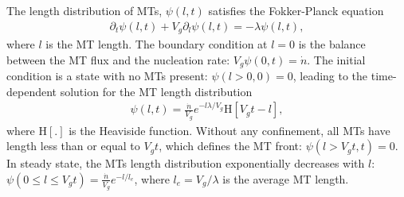 \documentclass[11pt]{article}
\begin{document}
The length distribution of MTs, $\psi(l,t)$ satisfies the Fokker-Planck equation
\begin{align}
\label{eq:FP}
\partial_t\psi(l,t) + V_g \partial_l\psi(l,t) = -\lambda\psi(l,t),
\end{align}
where $l$ is the MT length. The boundary condition at $l=0$ is the balance between the MT flux and the nucleation rate: $V_g\psi(0,t)=\dot n$. The initial condition is a state with no MTs present: $\psi(l>0,0) = 0$, leading to the time-dependent solution for the MT length distribution
\begin{align}
\psi(l,t) = \frac{\dot n}{V_g}e^{-l\lambda/V_g} \mbox{H}[V_g t - l],
\end{align}
where $\mbox{H}[.]$ is the Heaviside function. Without any confinement, all MTs have length less than or equal to $V_g t$, which defines the MT front: $\psi(l>V_g t, t) = 0$. In steady state, the MTs length distribution exponentially decreases with $l$:
$
\psi(0\le l\le V_g t) =\frac{\dot n}{V_g}e^{-l/l_e}$,
where $l_e = V_g/\lambda$ is the average MT length. 
\end{document}
